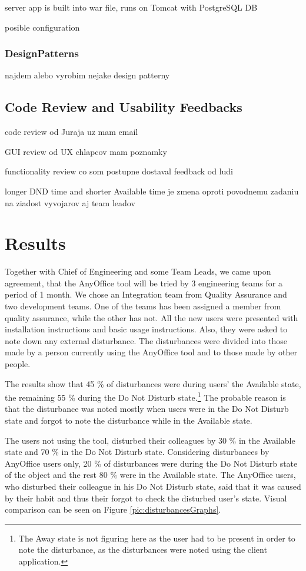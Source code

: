 \documentclass[11pt,singleside]{myfithesis2}
\begin{document}
server app is built into war file, runs on Tomcat with PostgreSQL DB

posible configuration


		\subsection{DesignPatterns}
najdem alebo vyrobim nejake design patterny

	
	\section{Code Review and Usability Feedbacks}

code review od Juraja uz mam email

GUI review od UX chlapcov mam poznamky

functionality review co som postupne dostaval feedback od ludi

longer DND time and shorter Available time je zmena oproti povodnemu zadaniu na ziadost vyvojarov aj team leadov


\chapter{Results}\label{results}
Together with Chief of Engineering and some Team Leads, we came upon agreement, that the AnyOffice tool will be tried by 3 engineering teams for a period of 1 month. We chose an Integration team from Quality Assurance and two development teams. One of the teams has been assigned a member from quality assurance, while the other has not. All the new users were presented with installation instructions and basic usage instructions. Also, they were asked to note down any external disturbance. The disturbances were divided into those made by a person currently using the AnyOffice tool and to those made by other people.

The results show that 45 \% of disturbances were during users' the Available state, the remaining 55 \% during the Do Not Disturb state.\footnote{The Away state is not figuring here as the user had to be present in order to note the disturbance, as the disturbances were noted using the client application.} The probable reason is that the disturbance was noted mostly when users were in the Do Not Disturb state and forgot to note the disturbance while in the Available state.

The users not using the tool, disturbed their colleagues by 30 \% in the Available state and 70 \% in the Do Not Disturb state. Considering disturbances by AnyOffice users only, 20 \% of disturbances were during the Do Not Disturb state of the object and the rest 80 \% were in the Available state. The AnyOffice users, who disturbed their colleague in his Do Not Disturb state, said that it was caused by their habit and thus their forgot to check the disturbed user's state. Visual comparison can be seen on Figure \ref{pic:disturbancesGraphs}.
\end{document}

